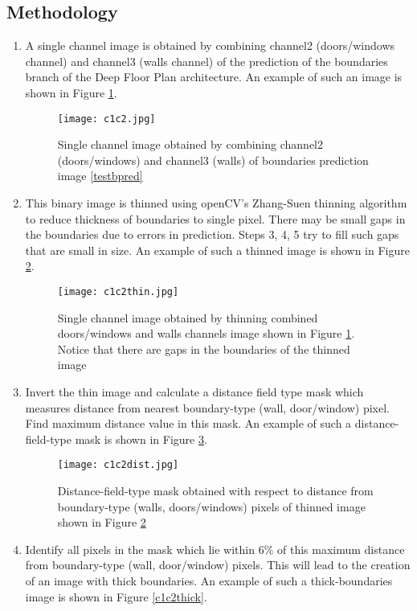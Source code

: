 \documentclass[a4paper]{article}
\begin{document}
\subsection{Methodology}
\begin{enumerate}
    \item A single channel image is obtained by combining channel2 (doors/windows channel) and channel3 (walls channel) of the prediction of the boundaries branch of the Deep Floor Plan architecture. An example of such an image is shown in Figure \ref{c1c2}.
    \begin{figure}[H]
    \centering
    \texttt{[image: c1c2.jpg]}
    \caption{Single channel image obtained by combining channel2 (doors/windows) and channel3 (walls) of boundaries prediction image \ref{testbpred}}
    \label{c1c2}
    \end{figure}
    \item This binary image is thinned using openCV's Zhang-Suen thinning algorithm to reduce thickness of boundaries to single pixel. There may be small gaps in the boundaries due to errors in prediction. Steps 3, 4, 5 try to fill such gaps that are small in size. An example of such a thinned image is shown in Figure \ref{c1c2thin}.
    \begin{figure}[H]
    \centering
    \texttt{[image: c1c2thin.jpg]}
    \caption{Single channel image obtained by thinning combined doors/windows and walls channels image shown in Figure \ref{c1c2}. Notice that there are gaps in the boundaries of the thinned image}
    \label{c1c2thin}
    \end{figure}
    \item Invert the thin image and calculate a distance field type mask which measures distance from nearest boundary-type (wall, door/window) pixel. Find maximum distance value in this mask. An example of such a distance-field-type mask is shown in Figure \ref{c1c2dist}.
    \begin{figure}[H]
    \centering
    \texttt{[image: c1c2dist.jpg]}
    \caption{Distance-field-type mask obtained with respect to distance from boundary-type (walls, doors/windows) pixels of thinned image shown in Figure \ref{c1c2thin}}
    \label{c1c2dist}
    \end{figure}
    \item Identify all pixels in the mask which lie within 6\% of this maximum distance from boundary-type (wall, door/window) pixels. This will lead to the creation of an image with thick boundaries. An example of such a thick-boundaries image is shown in Figure \ref{c1c2thick}.

\end{enumerate}
\end{document}
